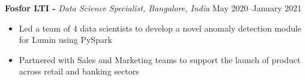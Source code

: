 \textbf{Fosfor LTI -} \textit{Data Science Specialist, Bangalore, India} \hfill May 2020--January 2021\par

\begin{itemize}
	\item Led a team of 4 data scientists to develop a novel anomaly detection module for Lumin using PySpark
	\item Partnered with Sales and Marketing teams to support the launch of product across retail and banking sectors
\end{itemize}\par
